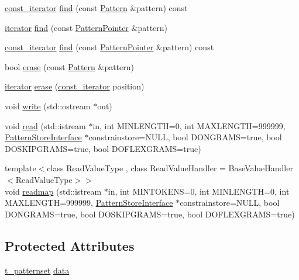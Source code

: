 \begin{DoxyCompactItemize}
\item 
\hyperlink{classPatternSet_a5d419991ea0abb0fbc4a2282574b1b8c}{const\+\_\+iterator} \hyperlink{classPatternSet_a56c0fcc8deb357628e778d3cc0d3c418}{find} (const \hyperlink{classPattern}{Pattern} \&pattern) const 
\item 
\hyperlink{classPatternSet_a18b78ea966c57db2373741291ba610f3}{iterator} \hyperlink{classPatternSet_a0463855da3729a70a59ee2e24265fbf8}{find} (const \hyperlink{classPatternPointer}{Pattern\+Pointer} \&pattern)
\item 
\hyperlink{classPatternSet_a5d419991ea0abb0fbc4a2282574b1b8c}{const\+\_\+iterator} \hyperlink{classPatternSet_acba3d1e3b3bce94f6768c014b0d17140}{find} (const \hyperlink{classPatternPointer}{Pattern\+Pointer} \&pattern) const 
\item 
bool \hyperlink{classPatternSet_afd2c053ac589e30edd7eda5c9f95c771}{erase} (const \hyperlink{classPattern}{Pattern} \&pattern)
\item 
\hyperlink{classPatternSet_a18b78ea966c57db2373741291ba610f3}{iterator} \hyperlink{classPatternSet_afbcbec2296a6ea98b809dcd9288eb756}{erase} (\hyperlink{classPatternSet_a5d419991ea0abb0fbc4a2282574b1b8c}{const\+\_\+iterator} position)
\item 
void \hyperlink{classPatternSet_ae55073ee2384d529faf51fca22c8dee1}{write} (std\+::ostream $\ast$out)
\item 
void \hyperlink{classPatternSet_a97bff883909c96f3f8a07a9c9ef83d84}{read} (std\+::istream $\ast$in, int M\+I\+N\+L\+E\+N\+G\+T\+H=0, int M\+A\+X\+L\+E\+N\+G\+T\+H=999999, \hyperlink{classPatternStoreInterface}{Pattern\+Store\+Interface} $\ast$constrainstore=N\+U\+L\+L, bool D\+O\+N\+G\+R\+A\+M\+S=true, bool D\+O\+S\+K\+I\+P\+G\+R\+A\+M\+S=true, bool D\+O\+F\+L\+E\+X\+G\+R\+A\+M\+S=true)
\item 
{\footnotesize template$<$class Read\+Value\+Type , class Read\+Value\+Handler  = Base\+Value\+Handler$<$\+Read\+Value\+Type$>$$>$ }\\void \hyperlink{classPatternSet_a7c974deb65a7b48ada65a4b4a45a5a3f}{readmap} (std\+::istream $\ast$in, int M\+I\+N\+T\+O\+K\+E\+N\+S=0, int M\+I\+N\+L\+E\+N\+G\+T\+H=0, int M\+A\+X\+L\+E\+N\+G\+T\+H=999999, \hyperlink{classPatternStoreInterface}{Pattern\+Store\+Interface} $\ast$constrainstore=N\+U\+L\+L, bool D\+O\+N\+G\+R\+A\+M\+S=true, bool D\+O\+S\+K\+I\+P\+G\+R\+A\+M\+S=true, bool D\+O\+F\+L\+E\+X\+G\+R\+A\+M\+S=true)
\end{DoxyCompactItemize}
\subsection*{Protected Attributes}
\begin{DoxyCompactItemize}
\item 
\hyperlink{patternstore_8h_a29bbbbc6d95519f30358276784e16c25}{t\+\_\+patternset} \hyperlink{classPatternSet_afa1d4a71d4b1f17a5fa5fba98f637687}{data}
\end{DoxyCompactItemize}


